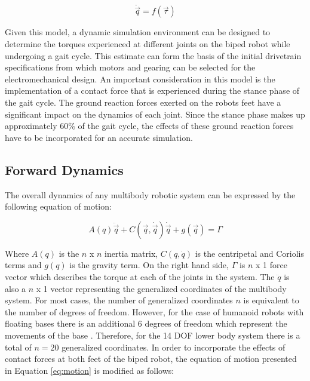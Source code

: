 \begin{equation}
	\ddot{\vec{q}} = f(\vec{\tau})
\end{equation}

Given this model, a dynamic simulation environment can be designed to determine the torques experienced at different joints on the biped robot while undergoing a gait cycle. This estimate can form the basis of the initial drivetrain specifications from which motors and gearing can be selected for the electromechanical design. An important consideration in this model is the implementation of a contact force that is experienced during the stance phase of the gait cycle. The ground reaction forces exerted on the robots feet have a significant impact on the dynamics of each joint. Since the stance phase makes up approximately 60\% of the gait cycle, the effects of these ground reaction forces have to be incorporated for an accurate simulation. 

\subsection{Forward Dynamics} %
\label{sec:forward_dynamics}

The overall dynamics of any multibody robotic system can be expressed by the following equation of motion: 

\begin{equation}
	\label{eq:motion}
	A(q)\ddot{\vec{q}} + C(\vec{q},\dot{\vec{q}})\dot{\vec{q}} + g(\vec{q}) = \Gamma
\end{equation}

Where $A(q)$ is the $n$ x $n$ inertia matrix, $C(q,\dot{q})$ is the centripetal and Coriolis terms and $g(q)$ is the gravity term. On the right hand side, $\Gamma$ is $n$ x 1 force vector which describes the torque at each of the joints in the system. The $\ddot{q}$ is also a $n$ x 1 vector representing the generalized coordinates of the multibody system. For most cases, the number of generalized coordinates $n$ is equivalent to the number of degrees of freedom. However, for the case of humanoid robots with floating bases there is an additional 6 degrees of freedom which represent the movements of the base \cite{Perrin:1997wn}. Therefore, for the 14 DOF lower body system there is a total of $n = 20$ generalized coordinates. In order to incorporate the effects of contact forces at both feet of the biped robot, the equation of motion presented in Equation \ref{eq:motion} is modified as follows: 


